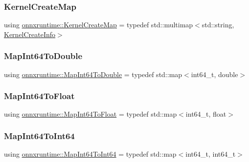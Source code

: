 \subsubsection{\texorpdfstring{Kernel\+Create\+Map}{KernelCreateMap}}
{\footnotesize\ttfamily using \mbox{\hyperlink{namespaceonnxruntime_a7f8ff42cd4a103e3be4c6f4227448d28}{onnxruntime\+::\+Kernel\+Create\+Map}} = typedef std\+::multimap$<$std\+::string, \mbox{\hyperlink{structonnxruntime_1_1KernelCreateInfo}{Kernel\+Create\+Info}}$>$}

\mbox{\label{namespaceonnxruntime_a16918e983bd34c8bee7725fc39740cf1}} 
\subsubsection{\texorpdfstring{Map\+Int64\+To\+Double}{MapInt64ToDouble}}
{\footnotesize\ttfamily using \mbox{\hyperlink{namespaceonnxruntime_a16918e983bd34c8bee7725fc39740cf1}{onnxruntime\+::\+Map\+Int64\+To\+Double}} = typedef std\+::map$<$int64\+\_\+t, double$>$}

\mbox{\label{namespaceonnxruntime_ab3c488c9d67df3d8a91c90f9bb360e93}} 
\subsubsection{\texorpdfstring{Map\+Int64\+To\+Float}{MapInt64ToFloat}}
{\footnotesize\ttfamily using \mbox{\hyperlink{namespaceonnxruntime_ab3c488c9d67df3d8a91c90f9bb360e93}{onnxruntime\+::\+Map\+Int64\+To\+Float}} = typedef std\+::map$<$int64\+\_\+t, float$>$}

\mbox{\label{namespaceonnxruntime_a3dab3548e5750ae69a56e308a4031ad0}} 
\subsubsection{\texorpdfstring{Map\+Int64\+To\+Int64}{MapInt64ToInt64}}
{\footnotesize\ttfamily using \mbox{\hyperlink{namespaceonnxruntime_a3dab3548e5750ae69a56e308a4031ad0}{onnxruntime\+::\+Map\+Int64\+To\+Int64}} = typedef std\+::map$<$int64\+\_\+t, int64\+\_\+t$>$}

